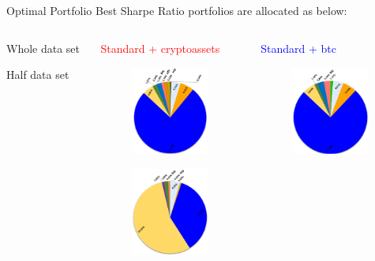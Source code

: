 \documentclass[c, 10pt]{beamer}
\newcommand\Fontvi{\fontsize{8}{7.2}\selectfont}
\begin{document}
\begin{frame}{Optimal Portfolio}
Best Sharpe Ratio portfolios are allocated as below:
	\begin{columns}
		\begin{column}{0.1\textwidth}
		    \bigskip
		    \bigskip
		    
            \Fontvi{}Whole data set
            \bigskip
            \bigskip
            \bigskip
            \bigskip
            \bigskip
            \bigskip
            \bigskip
            
            
            \Fontvi{}Half data set
		\end{column}
		\begin{column}{0.3\textwidth}  
		    \begin{center}
            \Fontvi{}\textcolor{red}{Standard + cryptoassets}
            \end{center}
            \begin{figure}
                \centering
                \includegraphics[width=2.55cm]{Images/torte/torta_whole_tutte.png}
            \end{figure}
            \begin{figure}
                \centering
                \includegraphics[width=2.55cm]{Images/torte/torta_half_tutte.png}
            \end{figure}
		\end{column}
		\begin{column}{0.3\textwidth}  
		    \begin{center}
            \Fontvi{}\textcolor{blue}{Standard + btc}
            \end{center}
            \begin{figure}
                \centering
                \includegraphics[width=2.55cm]{Images/torte/torta_whole_btc.png}

\end{figure}
\end{column}
\end{columns}
\end{frame}
\end{document}
